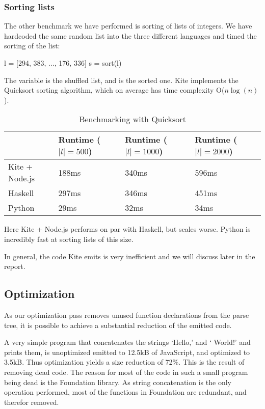 \subsubsection{Sorting lists}

The other benchmark we have performed is sorting of lists of integers. We have hardcoded the same random list into the three different languages and timed the sorting of the list:

\begin{kite}
l = [294, 383, ..., 176, 336]
s = sort(l)
\end{kite}

The variable  is the shuffled list, and  is the sorted one. Kite implements the  Quicksort sorting algorithm, which on average has time complexity O($n \log(n)$).

\begin{table}[h]
  \centering
  \begin{tabular}{|l|l|l|l|}
    \hline
                   & Runtime ($|l| = 500$) & Runtime ($|l| = 1000$) & Runtime ($|l| = 2000$) \\
    \hline
    Kite + Node.js & 188ms                 & 340ms                  & 596ms                  \\
    Haskell        & 297ms                 & 346ms                  & 451ms                  \\
    Python         & 29ms                  & 32ms                   & 34ms                   \\
    \hline
  \end{tabular}
  \caption{Benchmarking with Quicksort}
\end{table}

Here Kite + Node.js performs on par with Haskell, but scales worse. Python is incredibly fast at sorting lists of this size.

In general, the code Kite emits is very inefficient and we will discuss later in the report.


\subsection{Optimization}
As our optimization pass removes unused function declarations from the parse tree, it is possible to achieve a substantial reduction of the emitted code.

A very simple program that concatenates the strings `Hello,' and ` World!' and prints them, is unoptimized emitted to 12.5kB of JavaScript, and optimized to 3.5kB. Thus optimization yields a size reduction of 72\%. This is the result of removing dead code. The reason for most of the code in such a small program being dead is the Foundation library. As string concatenation is the only operation performed, most of the functions in Foundation are redundant, and therefor removed.


